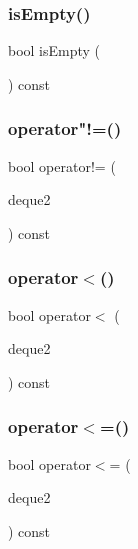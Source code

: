 \mbox{\label{classDeque_acf82f9b2937375c7b1cf3dccb3df3312}} 
\subsubsection{\texorpdfstring{is\+Empty()}{isEmpty()}}
{\footnotesize\ttfamily bool is\+Empty (\begin{DoxyParamCaption}{ }\end{DoxyParamCaption}) const}

\mbox{\label{classDeque_a512bc8214fed49868d85acd8f1e351d3}} 
\subsubsection{\texorpdfstring{operator"!=()}{operator!=()}}
{\footnotesize\ttfamily bool operator!= (\begin{DoxyParamCaption}\item[{const \mbox{\hyperlink{classDeque}{Deque}}$<$ Value\+Type $>$ \&}]{deque2 }\end{DoxyParamCaption}) const}

\mbox{\label{classDeque_afdfe6d4b99c8d185f9f8c6d48fc19c88}} 
\subsubsection{\texorpdfstring{operator$<$()}{operator<()}}
{\footnotesize\ttfamily bool operator$<$ (\begin{DoxyParamCaption}\item[{const \mbox{\hyperlink{classDeque}{Deque}}$<$ Value\+Type $>$ \&}]{deque2 }\end{DoxyParamCaption}) const}

\mbox{\label{classDeque_a08a801e1cca1a84e7fae799f5c12696e}} 
\subsubsection{\texorpdfstring{operator$<$=()}{operator<=()}}
{\footnotesize\ttfamily bool operator$<$= (\begin{DoxyParamCaption}\item[{const \mbox{\hyperlink{classDeque}{Deque}}$<$ Value\+Type $>$ \&}]{deque2 }\end{DoxyParamCaption}) const}

